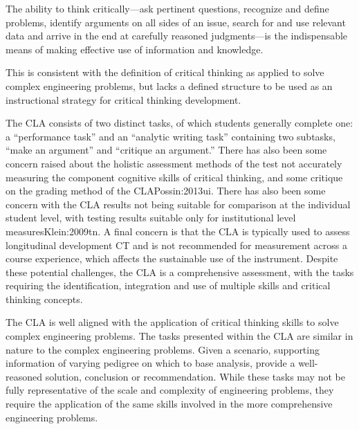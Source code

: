 The ability to think critically—ask pertinent questions, recognize and define problems, identify arguments on all sides of an issue, search for and use relevant data and arrive in the end at carefully reasoned judgments—is the indispensable means of making effective use of information and knowledge.

This is consistent with the definition of critical thinking as applied to solve complex engineering problems, but lacks a defined structure to be used as an instructional strategy for critical thinking development. 

The CLA consists of two distinct tasks, of which students generally complete one: a “performance task” and an “analytic writing task” containing two subtasks, “make an argument” and “critique an argument.” There has also been some concern raised about the holistic assessment methods of the test not accurately measuring the component cognitive skills of critical thinking, and some critique on the grading method of the CLA{Possin:2013ui}. There has also been some concern with the CLA results not being suitable for comparison at the individual student level, with testing results suitable only for institutional level measures{Klein:2009tn}.  A final concern is that the CLA is typically used to assess longitudinal development CT and is not recommended for measurement across a course experience, which affects the sustainable use of the instrument.  Despite these potential challenges, the CLA is a comprehensive assessment, with the tasks requiring the identification, integration and use of multiple skills and critical thinking concepts.  

The CLA is well aligned with the application of critical thinking skills to solve complex engineering problems.  The tasks presented within the CLA are similar in nature to the complex engineering problems.  Given a scenario, supporting information of varying pedigree on which to base analysis, provide a well-reasoned solution, conclusion or recommendation.   While these tasks may not be fully representative of the scale and complexity of engineering problems, they require the application of the same skills involved in the more comprehensive engineering problems.
